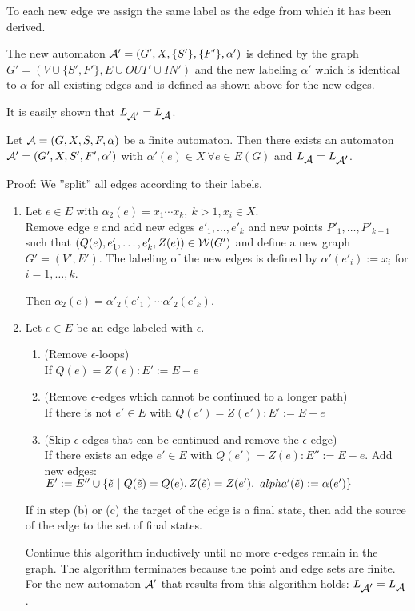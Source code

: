 To each new edge we assign the same label as the edge from which it has been
derived.

The new automaton $\mbox{$\mathcal{A'}$} = (G', X, \{S'\}, \{F'\}, \alpha')$ is defined
by the graph $G' = (V \cup \{ S', F' \}, E \cup OUT' \cup IN')$
and the new labeling $\alpha'$ which is identical to $\alpha$ for all existing edges and is defined as shown above for the new edges.

It is easily shown that $\mbox{$L_{\mbox{$\mathcal{A'}$}}$} = \mbox{$L_{\mbox{$\mathcal{A}$}}$}$.

\begin{lemma}
Let $\mbox{$\mathcal{A}$} = (G, X, S, F, \alpha)$ be a finite automaton. Then there
exists an automaton $\mbox{$\mathcal{A'}$} = (G', X, S', F', \alpha')$ with $\alpha'(e)
\in X\ \forall e \in E(G)$ and $\mbox{$L_{\mbox{$\mathcal{A}$}}$} = \mbox{$L_{\mbox{$\mathcal{A'}$}}$}$.
\end{lemma}

Proof: We ''split'' all edges according to their labels.

\begin{enumerate}
  \item Let $e \in E$ with $\alpha_2(e) = x_1 \cdots x_k,\ k > 1, x_i \in X$.\\
  Remove edge $e$ and add new edges $e'_1,
  \ldots, e'_k$ and new points $P'_1, \ldots, P'_{k-1}$ such that $(Q(e),
  e'_1, \ldots, e'_k, Z(e)) \in \mbox{$\mathcal{W}(G')$}$ and define a new graph $G' =
  (V', E')$. The labeling of the new edges is defined by $\alpha'(e'_i) := x_i$
  for $i = 1, \ldots, k$.
  
  Then $\alpha_2(e) = \alpha'_2(e'_1) \cdots \alpha'_2(e'_k)$.
  
  \item Let $e \in E$ be an edge labeled with $\epsilon$.
  \begin{enumerate}
    \item  (Remove $\epsilon$-loops) \\
    If $Q(e) = Z(e) : E' := E - e$
    \item (Remove
    $\epsilon$-edges which cannot be continued to a longer path)\\
    If there is
    not $e' \in E$ with $Q(e') = Z(e') : E' := E - e$
    \item  (Skip $\epsilon$-edges that can be continued and remove the
    $\epsilon$-edge)\\
    If there exists an edge $e' \in E$ with $Q(e') = Z(e) : E'' := E - e$.
    Add new edges: $E' := E'' \cup \{
    \tilde{e} \ |\  Q(\tilde{e}) = Q(e), Z(\tilde{e}) = Z(e'),\
    alpha'(\tilde{e}) := \alpha(e') \}$
  \end{enumerate}
  If in step (b) or (c) the target of the edge is a final state, then add the
  source of the edge to the set of final states.
  
  Continue this algorithm inductively until no more $\epsilon$-edges remain in
  the graph. The algorithm terminates because the point and edge sets are
  finite. For the new automaton $\mbox{$\mathcal{A'}$}$ that results from this algorithm
  holds: $\mbox{$L_{\mbox{$\mathcal{A'}$}}$} = \mbox{$L_{\mbox{$\mathcal{A}$}}$}$.
\end{enumerate}

